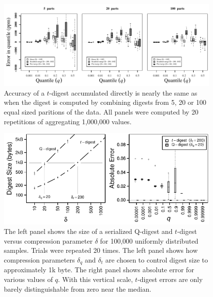 \documentclass[]{statsoc}
\begin{document}
\begin{figure}[p] %
   \centering
   \includegraphics[width=5.5in]{figures/merge.pdf} 
   \caption{Accuracy of a $t$-digest accumulated directly is nearly the same as when the digest is computed by combining digests from 5, 20 or 100 equal sized paritions of the data.  All panels were computed by 20 repetitions of aggregating 1,000,000 values. }
   \label{fig:merge}
\end{figure}
\begin{figure}[p] %
   \centering
   \includegraphics[width=4.5in]{figures/qd-sizes.pdf} 
   \caption{The left panel shows the size of a serialized Q-digest and $t$-digest versus compression parameter $\delta$ for 100,000 uniformly distributed samples. Trials were repeated 20 times. The left panel shows how compression parameters $\delta_q$ and $\delta_t$ are chosen to control digest size to approximately 1k byte. The right panel shows absolute error for various values of $q$.  With this vertical scale, $t$-digest errors are only barely distinguishable from zero near the median.  }
   \label{fig:qd-comparison}
\end{figure}

{}
\end{document}
